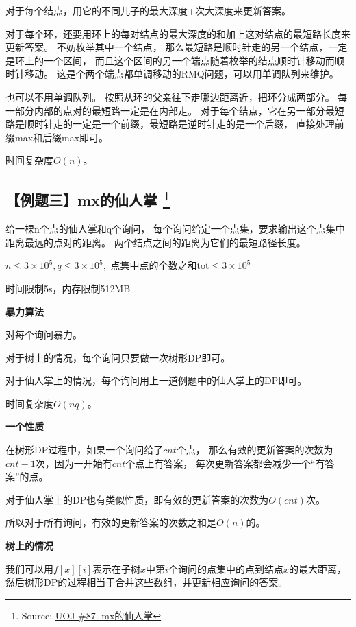 \documentclass{noithesis}
\begin{document}
对于每个结点，用它的不同儿子的最大深度+次大深度来更新答案。

对于每个环，还要用环上的每对结点的最大深度的和加上这对结点的最短路长度来更新答案。
不妨枚举其中一个结点，
那么最短路是顺时针走的另一个结点，一定是环上的一个区间，
而且这个区间的另一个端点随着枚举的结点顺时针移动而顺时针移动。
这是个两个端点都单调移动的RMQ问题，可以用单调队列来维护。

也可以不用单调队列。
按照从环的父亲往下走哪边距离近，把环分成两部分。
每一部分内部的点对的最短路一定是在内部走。
对于每个结点，它在另一部分最短路是顺时针走的一定是一个前缀，最短路是逆时针走的是一个后缀，
直接处理前缀max和后缀max即可。

时间复杂度$O(n)$。





\subsection{【例题三】mx的仙人掌 \protect \footnote{Source: \href{http://uoj.ac/problem/87}{UOJ \#87. mx的仙人掌}}}

给一棵n个点的仙人掌和q个询问，
每个询问给定一个点集，要求输出这个点集中距离最远的点对的距离。
两个结点之间的距离为它们的最短路径长度。

$n \le 3 \times 10^5, q \le 3 \times 10^5, $ 点集中点的个数之和$ \mathrm{tot} \le 3 \times 10^5$

时间限制5s，内存限制512MB

\text{}

\textbf{暴力算法}

对每个询问暴力。

对于树上的情况，每个询问只要做一次树形DP即可。

对于仙人掌上的情况，每个询问用上一道例题中的仙人掌上的DP即可。

时间复杂度$O(n q)$。

\text{}

\textbf{一个性质}

在树形DP过程中，如果一个询问给了$cnt$个点，
那么有效的更新答案的次数为$cnt - 1$次，因为一开始有$cnt$个点上有答案，
每次更新答案都会减少一个``有答案''的点。

对于仙人掌上的DP也有类似性质，即有效的更新答案的次数为$O(cnt)$次。

所以对于所有询问，有效的更新答案的次数之和是$O(n)$的。

\text{}

\textbf{树上的情况}

我们可以用$f[x][i]$表示在子树$x$中第$i$个询问的点集中的点到结点$x$的最大距离，
然后树形DP的过程相当于合并这些数组，并更新相应询问的答案。
\end{document}
